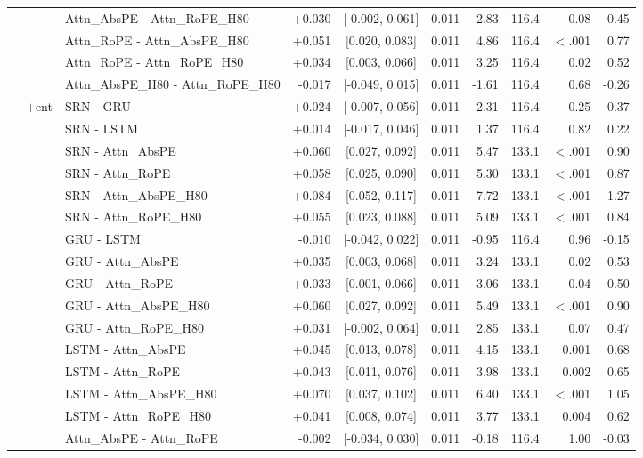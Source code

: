 \begin{longtable}{@{}lllrcrrrrr@{}}
 &  & Attn\_AbsPE - Attn\_RoPE\_H80 & +0.030 & [-0.002, 0.061] & 0.011 & 2.83 & 116.4 & 0.08 & 0.45 \\
 &  & Attn\_RoPE - Attn\_AbsPE\_H80 & +0.051 & [0.020, 0.083] & 0.011 & 4.86 & 116.4 & $<$.001 & 0.77 \\
 &  & Attn\_RoPE - Attn\_RoPE\_H80 & +0.034 & [0.003, 0.066] & 0.011 & 3.25 & 116.4 & 0.02 & 0.52 \\
 &  & Attn\_AbsPE\_H80 - Attn\_RoPE\_H80 & -0.017 & [-0.049, 0.015] & 0.011 & -1.61 & 116.4 & 0.68 & -0.26 \\
\addlinespace[2pt]
 & $+$ent & SRN - GRU & +0.024 & [-0.007, 0.056] & 0.011 & 2.31 & 116.4 & 0.25 & 0.37 \\
 &  & SRN - LSTM & +0.014 & [-0.017, 0.046] & 0.011 & 1.37 & 116.4 & 0.82 & 0.22 \\
 &  & SRN - Attn\_AbsPE & +0.060 & [0.027, 0.092] & 0.011 & 5.47 & 133.1 & $<$.001 & 0.90 \\
 &  & SRN - Attn\_RoPE & +0.058 & [0.025, 0.090] & 0.011 & 5.30 & 133.1 & $<$.001 & 0.87 \\
 &  & SRN - Attn\_AbsPE\_H80 & +0.084 & [0.052, 0.117] & 0.011 & 7.72 & 133.1 & $<$.001 & 1.27 \\
 &  & SRN - Attn\_RoPE\_H80 & +0.055 & [0.023, 0.088] & 0.011 & 5.09 & 133.1 & $<$.001 & 0.84 \\
 &  & GRU - LSTM & -0.010 & [-0.042, 0.022] & 0.011 & -0.95 & 116.4 & 0.96 & -0.15 \\
 &  & GRU - Attn\_AbsPE & +0.035 & [0.003, 0.068] & 0.011 & 3.24 & 133.1 & 0.02 & 0.53 \\
 &  & GRU - Attn\_RoPE & +0.033 & [0.001, 0.066] & 0.011 & 3.06 & 133.1 & 0.04 & 0.50 \\
 &  & GRU - Attn\_AbsPE\_H80 & +0.060 & [0.027, 0.092] & 0.011 & 5.49 & 133.1 & $<$.001 & 0.90 \\
 &  & GRU - Attn\_RoPE\_H80 & +0.031 & [-0.002, 0.064] & 0.011 & 2.85 & 133.1 & 0.07 & 0.47 \\
 &  & LSTM - Attn\_AbsPE & +0.045 & [0.013, 0.078] & 0.011 & 4.15 & 133.1 & 0.001 & 0.68 \\
 &  & LSTM - Attn\_RoPE & +0.043 & [0.011, 0.076] & 0.011 & 3.98 & 133.1 & 0.002 & 0.65 \\
 &  & LSTM - Attn\_AbsPE\_H80 & +0.070 & [0.037, 0.102] & 0.011 & 6.40 & 133.1 & $<$.001 & 1.05 \\
 &  & LSTM - Attn\_RoPE\_H80 & +0.041 & [0.008, 0.074] & 0.011 & 3.77 & 133.1 & 0.004 & 0.62 \\
 &  & Attn\_AbsPE - Attn\_RoPE & -0.002 & [-0.034, 0.030] & 0.011 & -0.18 & 116.4 & 1.00 & -0.03 \\

\end{longtable}
